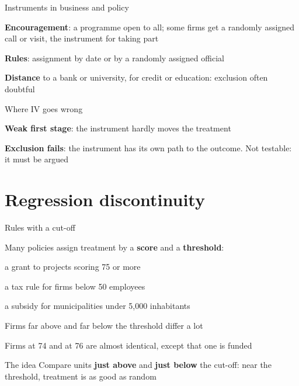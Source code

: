 \documentclass[aspectratio=169,xcolor=table]{beamer}
\begin{document}
\begin{frame}{Instruments in business and policy}
\small
\bi
  \item \textbf{Encouragement}: a programme open to all; some firms get a randomly assigned call or visit, the instrument for taking part
  \item \textbf{Rules}: assignment by date or by a randomly assigned official
  \item \textbf{Distance} to a bank or university, for credit or education: exclusion often doubtful
\ei
\begin{alertblock}{Where IV goes wrong}
\bi
  \item \textbf{Weak first stage}: the instrument hardly moves the treatment
  \item \textbf{Exclusion fails}: the instrument has its own path to the outcome. Not testable: it must be argued
\ei
\end{alertblock}
\end{frame}

\section{Regression discontinuity}

\begin{frame}{Rules with a cut-off}
\small
\bi
  \item Many policies assign treatment by a \textbf{score} and a \textbf{threshold}:
    \bi
      \item a grant to projects scoring 75 or more
      \item a tax rule for firms below 50 employees
      \item a subsidy for municipalities under 5,000 inhabitants
    \ei
  \item Firms far above and far below the threshold differ a lot
  \item Firms at 74 and at 76 are almost identical, except that one is funded
\ei
\begin{block}{The idea}
Compare units \textbf{just above} and \textbf{just below} the cut-off: near the threshold, treatment is as good as random
\end{block}
\end{frame}
\end{document}
